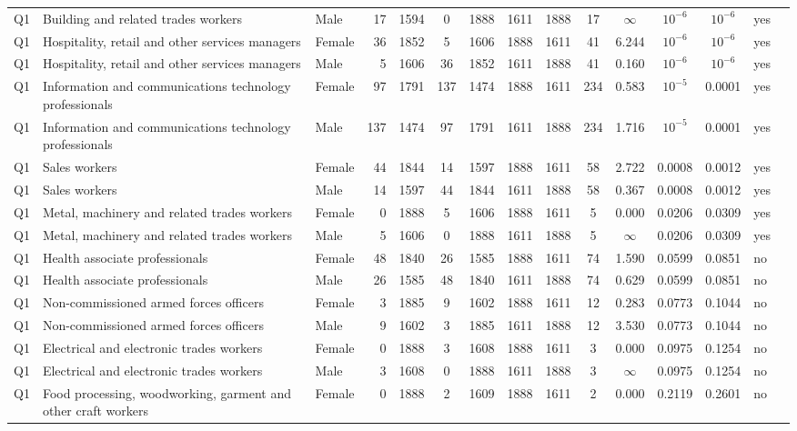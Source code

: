 \begin{longtable}{lllrcccccccccll}
Q1 & Building and related trades workers & Male & 17 & 1594 & 0 & 1888 & 1611 & 1888 & 17 & $\infty$ & $10^{-6}$ & $10^{-6}$ & yes \\
Q1 & Hospitality, retail and other services managers & Female & 36 & 1852 & 5 & 1606 & 1888 & 1611 & 41 & 6.244 & $10^{-6}$ & $10^{-6}$ & yes \\
Q1 & Hospitality, retail and other services managers & Male & 5 & 1606 & 36 & 1852 & 1611 & 1888 & 41 & 0.160 & $10^{-6}$ & $10^{-6}$ & yes \\
Q1 & Information and communications technology professionals & Female & 97 & 1791 & 137 & 1474 & 1888 & 1611 & 234 & 0.583 & $10^{-5}$ & 0.0001 & yes \\
Q1 & Information and communications technology professionals & Male & 137 & 1474 & 97 & 1791 & 1611 & 1888 & 234 & 1.716 & $10^{-5}$ & 0.0001 & yes \\
Q1 & Sales workers & Female & 44 & 1844 & 14 & 1597 & 1888 & 1611 & 58 & 2.722 & 0.0008 & 0.0012 & yes \\
Q1 & Sales workers & Male & 14 & 1597 & 44 & 1844 & 1611 & 1888 & 58 & 0.367 & 0.0008 & 0.0012 & yes \\
Q1 & Metal, machinery and related trades workers & Female & 0 & 1888 & 5 & 1606 & 1888 & 1611 & 5 & 0.000 & 0.0206 & 0.0309 & yes \\
Q1 & Metal, machinery and related trades workers & Male & 5 & 1606 & 0 & 1888 & 1611 & 1888 & 5 & $\infty$ & 0.0206 & 0.0309 & yes \\
Q1 & Health associate professionals & Female & 48 & 1840 & 26 & 1585 & 1888 & 1611 & 74 & 1.590 & 0.0599 & 0.0851 & no \\
Q1 & Health associate professionals & Male & 26 & 1585 & 48 & 1840 & 1611 & 1888 & 74 & 0.629 & 0.0599 & 0.0851 & no \\
Q1 & Non-commissioned armed forces officers & Female & 3 & 1885 & 9 & 1602 & 1888 & 1611 & 12 & 0.283 & 0.0773 & 0.1044 & no \\
Q1 & Non-commissioned armed forces officers & Male & 9 & 1602 & 3 & 1885 & 1611 & 1888 & 12 & 3.530 & 0.0773 & 0.1044 & no \\
Q1 & Electrical and electronic trades workers & Female & 0 & 1888 & 3 & 1608 & 1888 & 1611 & 3 & 0.000 & 0.0975 & 0.1254 & no \\
Q1 & Electrical and electronic trades workers & Male & 3 & 1608 & 0 & 1888 & 1611 & 1888 & 3 & $\infty$ & 0.0975 & 0.1254 & no \\
Q1 & Food processing, woodworking, garment and other craft workers & Female & 0 & 1888 & 2 & 1609 & 1888 & 1611 & 2 & 0.000 & 0.2119 & 0.2601 & no \\

\end{longtable}
